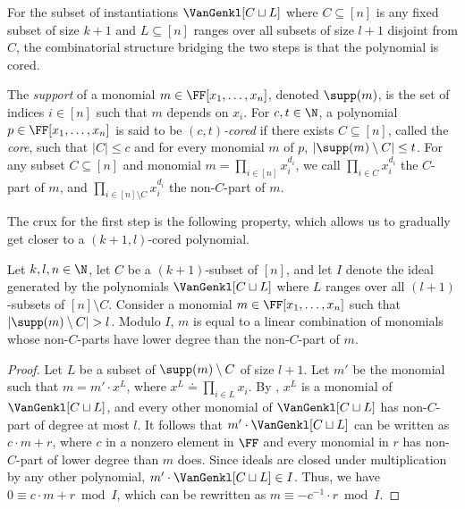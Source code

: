 For the subset of instantiations $\VanGenkl[C \sqcup L]$ where $C \subseteq [n]$ is any fixed subset of size $k+1$ and $L \subseteq [n]$ ranges over all subsets of size $l+1$ disjoint from $C$, the combinatorial structure bridging the two steps is that the polynomial is cored.

\begin{definition}
  \label{def.sunform}
  The \emph{support} of a monomial $m \in \FF[x_1,\dots,x_n]$, denoted $\supp(m)$, is the set of indices $i \in [n]$ such that $m$ depends on $x_i$. 
  For \(c,t\in\N\),
  a polynomial \(p \in \FF[x_1,\dots,x_n]\) is said to be \emph{\((c,t)\)-cored} if there exists $C \subseteq [n]$, called the \emph{core}, such that $|C| \le c$ and for every monomial $m$ of \(p\), $|\supp(m) \setminus C| \le t$.
  For any subset $C \subseteq [n]$ and monomial $m = \prod_{i \in [n]} x_i^{d_i}$, we call $\prod_{i \in C} x_i^{d_i}$ the $C$-part of $m$, and $\prod_{i \in [n] \setminus C} x_i^{d_i}$ the non-$C$-part of $m$.
\end{definition}

The crux for the first step is the following property, which allows us to gradually get closer to a $(k+1,l)$-cored polynomial. 

  \begin{proposition}
    \label{prop.lem.vangen-coredform}
    Let \(k,l,n\in\N\), let \(C\) be a \((k+1)\)-subset of \([n]\), and let $I$ denote the ideal generated by the polynomials $\VanGenkl[C \sqcup L]$ where $L$ ranges over all $(l+1)$-subsets of $[n] \setminus C$. Consider a monomial $m \in \FF[x_1,\dots,x_n]$ such that $|\supp(m) \setminus C| > l$. Modulo $I$, $m$ is equal to a linear combination of monomials whose non-$C$-parts have lower degree than the non-$C$-part of $m$.
  \end{proposition}
\begin{proof}
  Let $L$ be a subset of $\supp(m) \setminus C$ of size $l+1$. Let $m'$ be the monomial such that $m = m' \cdot x^L$, where $x^L \doteq \prod_{i \in L} x_i$.
  By ,
  \(x^L\) is a monomial of $\VanGenkl[C \sqcup L]$,
  and every other monomial of $\VanGenkl[C \sqcup L]$ has non-$C$-part of degree at most $l$. 
  It follows that $m' \cdot \VanGenkl[C \sqcup L]$ can be written as $c \cdot m + r$, where $c$ in a nonzero element in $\FF$ and every monomial in $r$ has non-$C$-part of lower degree than $m$ does. Since ideals are closed under multiplication by any other polynomial, $m' \cdot \VanGenkl[C \sqcup L] \in I$. Thus, we have $0 \equiv c \cdot m +r \bmod I$, which can be rewritten as $m \equiv - c^{-1} \cdot r \bmod I$.
\end{proof}

